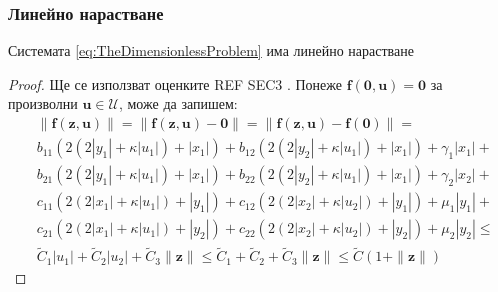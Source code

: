 \subsubsection{Линейно нарастване}
\begin{proposition}
  Системата \ref{eq:TheDimensionlessProblem} има линейно нарастване
\end{proposition}

\begin{proof}
  Ще се използват оценките \color{Red} REF SEC3 \color{Black}.
  Понеже $\mathbf{f}(\mathbf{0}, \mathbf{u}) = \mathbf{0}$ за произволни $\mathbf{u} \in \mathscr{U}$, може да запишем:
  \begin{equation}
    \begin{split}
      &\|\mathbf{f}(\mathbf{z}, \mathbf{u})\| = \|\mathbf{f}(\mathbf{z}, \mathbf{u}) - \mathbf{0}\| = \|\mathbf{f}(\mathbf{z}, \mathbf{u}) - \mathbf{f}(\mathbf{0})\| = \\
      &b_{11} (2 (2 |y_1| + \kappa |u_1|) + |x_1|) + b_{12}(2  (2 |y_2| + \kappa |u_1|) +  |x_1|) + \gamma_1 |x_1| + \\
      &b_{21} (2  (2|y_1| +  \kappa |u_1|) +  |x_1|) + b_{22} (2  (2|y_2| +  \kappa |u_1|) +  |x_1|) + \gamma_2 |x_2| + \\
      &c_{11}(2  (2|x_1| +  \kappa |u_1|) +  |y_1|) + c_{12} (2  (2|x_2| +  \kappa |u_2|) +  |y_1|) + \mu_1 |y_1| + \\
      &c_{21} (2  (2|x_1| +  \kappa |u_1|) +  |y_2|) + c_{22} (2  (2|x_2| +  \kappa |u_2|) +  |y_2|) + \mu_2 |y_2| \leq \\
      &\tilde{C}_1|u_1| + \tilde{C}_2|u_2| + \tilde{C}_3 \|\mathbf{z}\| \leq \tilde{C}_1 + \tilde{C}_2 + \tilde{C}_3 \|\mathbf{z}\| \leq \tilde{C}(1 + \|\mathbf{z}\|)
    \end{split}
  \end{equation}

\end{proof}

